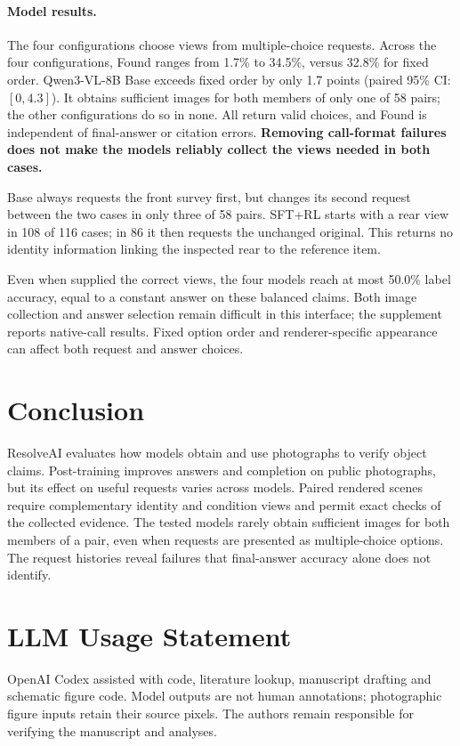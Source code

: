 \documentclass[10pt,twocolumn,letterpaper]{article}
\newcommand{\benchmark}{ResolveAI\xspace}
\begin{document}
\paragraph{Model results.}
The four configurations choose views from multiple-choice requests.
Across the four configurations, Found ranges from 1.7\% to 34.5\%, versus 32.8\% for fixed order.
Qwen3-VL-8B Base exceeds fixed order by only 1.7 points (paired 95\% CI: $[0,4.3]$).
It obtains sufficient images for both members of only one of 58 pairs; the other configurations do so in none.
All return valid choices, and Found is independent of final-answer or citation errors.
\textbf{Removing call-format failures does not make the models reliably collect the views needed in both cases.}

Base always requests the front survey first, but changes its second request between the two cases in only three of 58 pairs.
SFT+RL starts with a rear view in 108 of 116 cases; in 86 it then requests the unchanged original.
This returns no identity information linking the inspected rear to the reference item.

Even when supplied the correct views, the four models reach at most 50.0\% label accuracy, equal to a constant answer on these balanced claims.
Both image collection and answer selection remain difficult in this interface; the supplement reports native-call results.
Fixed option order and renderer-specific appearance can affect both request and answer choices.

\section{Conclusion}
\benchmark evaluates how models obtain and use photographs to verify object claims.
Post-training improves answers and completion on public photographs, but its effect on useful requests varies across models.
Paired rendered scenes require complementary identity and condition views and permit exact checks of the collected evidence.
The tested models rarely obtain sufficient images for both members of a pair, even when requests are presented as multiple-choice options.
The request histories reveal failures that final-answer accuracy alone does not identify.

\label{resolveai-main-end}
\clearpage
\section*{LLM Usage Statement}
OpenAI Codex assisted with code, literature lookup, manuscript drafting and schematic figure code.
Model outputs are not human annotations; photographic figure inputs retain their source pixels.
The authors remain responsible for verifying the manuscript and analyses.
{\small


}
\end{document}
